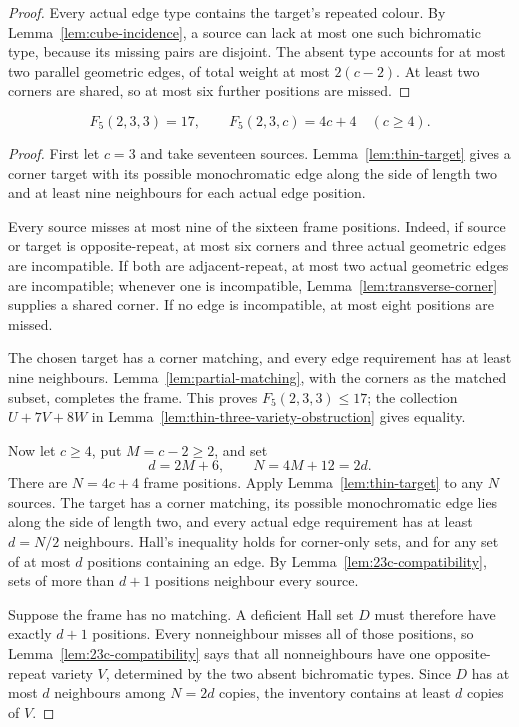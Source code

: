 \begin{proof}
Every actual edge type contains the target's repeated colour. By
Lemma~\ref{lem:cube-incidence}, a source
can lack at most one such bichromatic type, because its missing pairs
are disjoint. The absent type accounts for at most two parallel geometric
edges, of total weight at most $2(c-2)$. At least two corners are shared,
so at most six further positions are missed.
\end{proof}

\begin{theorem}
\label{thm:23c-sharp}
\[
 F_5(2,3,3)=17,\qquad
 F_5(2,3,c)=4c+4\quad(c\ge4).
\]
\end{theorem}

\begin{proof}
First let $c=3$ and take seventeen sources. Lemma~\ref{lem:thin-target}
gives a corner target with its possible monochromatic edge along the side
of length two and at least nine neighbours for each actual edge position.

Every source misses at most nine of the sixteen frame positions. Indeed,
if source or target is opposite-repeat, at most six corners and three
actual geometric edges are incompatible. If both are adjacent-repeat,
at most two actual geometric edges are incompatible; whenever one is
incompatible, Lemma~\ref{lem:transverse-corner} supplies a shared corner. If no edge
is incompatible, at most eight positions are missed.

The chosen target has a corner matching, and every edge requirement has
at least nine neighbours. Lemma~\ref{lem:partial-matching}, with the corners
as the matched subset, completes the frame. This proves $F_5(2,3,3)\le17$; the
collection $U+7V+8W$ in Lemma~\ref{lem:thin-three-variety-obstruction}
gives equality.

Now let $c\ge4$, put $M=c-2\ge2$, and set
\[
 d=2M+6,\qquad N=4M+12=2d.
\]
There are $N=4c+4$ frame positions. Apply Lemma~\ref{lem:thin-target} to
any $N$ sources. The target has a corner matching, its possible monochromatic
edge lies along the side of length two, and every actual edge requirement
has at least $d=N/2$ neighbours. Hall's inequality
holds for corner-only sets, and for any set of at most $d$ positions
containing an edge. By Lemma~\ref{lem:23c-compatibility}, sets of more
than $d+1$ positions neighbour every source.

Suppose the frame has no matching. A deficient Hall set $D$ must therefore
have exactly $d+1$ positions. Every nonneighbour misses all of those
positions, so Lemma~\ref{lem:23c-compatibility} says that all nonneighbours
have one opposite-repeat variety $V$, determined by the two absent
bichromatic types. Since $D$ has at most $d$ neighbours among $N=2d$
copies, the inventory contains at least $d$ copies of $V$.


\end{proof}
